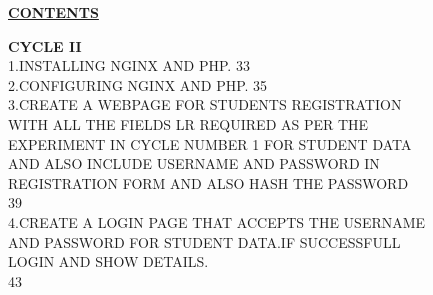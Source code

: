 \documentclass{article}
\begin{document}
\newpage
\textbf{ }
\newpage
{\begin{flushleft}
\begin{center}
    \textbf{\Huge\underline {CONTENTS}}
\end{center}
\vspace{0.3in}\hspace{2.5in} \textbf{\Large CYCLE II}\\
\vspace{0.5in}1.\hspace{1in}INSTALLING NGINX AND PHP. \hspace{2.5in}33\\
\vspace{0.5in}2.\hspace{1in}CONFIGURING NGINX AND PHP. \hspace{2.4in}35\\
\vspace{0.5in}3.\hspace{1in}CREATE A WEBPAGE FOR STUDENTS REGISTRATION\\\hspace{1in} WITH ALL THE FIELDS LR REQUIRED AS PER THE \\\hspace{1in}EXPERIMENT IN CYCLE NUMBER 1 FOR STUDENT DATA\\\hspace{1in} AND ALSO INCLUDE USERNAME AND
PASSWORD IN\\\hspace{1in} REGISTRATION FORM AND ALSO HASH THE PASSWORD\\ \vspace{-0.7in} \hspace{5.8in}39\\
\vspace{1in}4.\hspace{1in}CREATE A LOGIN PAGE THAT ACCEPTS THE USERNAME\\ \hspace{1in} AND PASSWORD FOR STUDENT DATA.IF SUCCESSFULL\\ \hspace{1in} LOGIN AND SHOW DETAILS.\\\vspace{-0.5in} \hspace{5.8in}43\\


\end{flushleft}}
\newpage
\textbf{ }
\newpage
  
\pagestyle{fancy}
\newpage
{}
\end{document}
